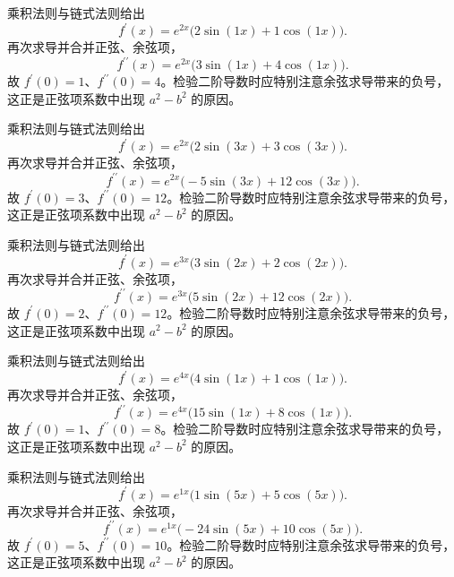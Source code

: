 \documentclass[12pt,fontset=fandol]{ctexart}
\begin{document}
\begin{solve}\label{ans:c8q20}
乘积法则与链式法则给出
\[
f^{\prime}(x)=e^{2x}\bigl(2\sin(1x)+1\cos(1x)\bigr).
\]
再次求导并合并正弦、余弦项，
\[
f^{\prime\prime}(x)=e^{2x}\bigl(3\sin(1x)+4\cos(1x)\bigr).
\]
故 $f^{\prime}(0)=1$、$f^{\prime\prime}(0)=4$。检验二阶导数时应特别注意余弦求导带来的负号，这正是正弦项系数中出现 $a^2-b^2$ 的原因。
\end{solve}

\begin{solve}\label{ans:c8q21}
乘积法则与链式法则给出
\[
f^{\prime}(x)=e^{2x}\bigl(2\sin(3x)+3\cos(3x)\bigr).
\]
再次求导并合并正弦、余弦项，
\[
f^{\prime\prime}(x)=e^{2x}\bigl(-5\sin(3x)+12\cos(3x)\bigr).
\]
故 $f^{\prime}(0)=3$、$f^{\prime\prime}(0)=12$。检验二阶导数时应特别注意余弦求导带来的负号，这正是正弦项系数中出现 $a^2-b^2$ 的原因。
\end{solve}

\begin{solve}\label{ans:c8q22}
乘积法则与链式法则给出
\[
f^{\prime}(x)=e^{3x}\bigl(3\sin(2x)+2\cos(2x)\bigr).
\]
再次求导并合并正弦、余弦项，
\[
f^{\prime\prime}(x)=e^{3x}\bigl(5\sin(2x)+12\cos(2x)\bigr).
\]
故 $f^{\prime}(0)=2$、$f^{\prime\prime}(0)=12$。检验二阶导数时应特别注意余弦求导带来的负号，这正是正弦项系数中出现 $a^2-b^2$ 的原因。
\end{solve}

\begin{solve}\label{ans:c8q23}
乘积法则与链式法则给出
\[
f^{\prime}(x)=e^{4x}\bigl(4\sin(1x)+1\cos(1x)\bigr).
\]
再次求导并合并正弦、余弦项，
\[
f^{\prime\prime}(x)=e^{4x}\bigl(15\sin(1x)+8\cos(1x)\bigr).
\]
故 $f^{\prime}(0)=1$、$f^{\prime\prime}(0)=8$。检验二阶导数时应特别注意余弦求导带来的负号，这正是正弦项系数中出现 $a^2-b^2$ 的原因。
\end{solve}

\begin{solve}\label{ans:c8q24}
乘积法则与链式法则给出
\[
f^{\prime}(x)=e^{1x}\bigl(1\sin(5x)+5\cos(5x)\bigr).
\]
再次求导并合并正弦、余弦项，
\[
f^{\prime\prime}(x)=e^{1x}\bigl(-24\sin(5x)+10\cos(5x)\bigr).
\]
故 $f^{\prime}(0)=5$、$f^{\prime\prime}(0)=10$。检验二阶导数时应特别注意余弦求导带来的负号，这正是正弦项系数中出现 $a^2-b^2$ 的原因。
\end{solve}
\end{document}
